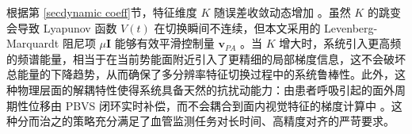 \documentclass{article}
\begin{document}
根据第 \cref{secdynamic coeff}节，特征维度 $K$ 随误差收敛动态增加 。虽然 $K$ 的跳变会导致 Lyapunov 函数 $V(t)$ 在切换瞬间不连续，但本文采用的 Levenberg-Marquardt 阻尼项 $\mu \mathbf{I}$ 能够有效平滑控制量 $\mathbf{v}_{PA}$ 。当 $K$ 增大时，系统引入更高频的频谱能量，相当于在当前势能面附近引入了更精细的局部梯度信息，这不会破坏总能量的下降趋势，从而确保了多分辨率特征切换过程中的系统鲁棒性。此外，这种物理层面的解耦特性使得系统具备天然的抗扰动能力：由患者呼吸引起的面外周期性位移由 PBVS 闭环实时补偿，而不会耦合到面内视觉特征的梯度计算中 。这种分而治之的策略充分满足了血管监测任务对长时间、高精度对齐的严苛要求。



\end{document}

